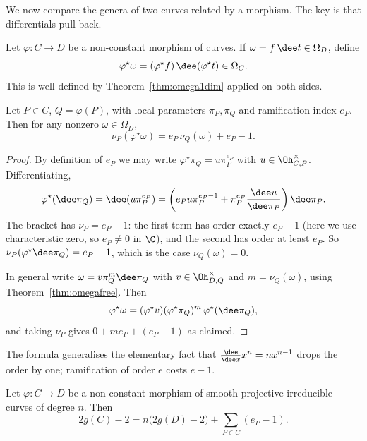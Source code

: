 We now compare the genera of two curves related by a morphism. The key is that differentials pull back.

Let $\varphi \colon C \to D$ be a non-constant morphism of curves. If $\omega = f\,\dee t \in \Omega_D$, define
$$\varphi^\star\omega = (\varphi^\star f)\,\dee(\varphi^\star t) \in \Omega_C.$$
This is well defined by Theorem~\ref{thm:omega1dim} applied on both sides.

\begin{lemma}\label{lem:pullbackdiff}
	Let $P \in C$, $Q = \varphi(P)$, with local parameters $\pi_P,\pi_Q$ and ramification index $e_P$. Then for any nonzero $\omega \in \Omega_D$,
	$$\nu_P(\varphi^\star\omega) = e_P\,\nu_Q(\omega) + e_P - 1.$$
\end{lemma}

\begin{proof}
	By definition of $e_P$ we may write $\varphi^\star\pi_Q = u\pi_P^{e_P}$ with $u \in \Oh_{C,P}^\times$. Differentiating,
	$$\varphi^\star(\dee\pi_Q) = \dee(u\pi_P^{e_P}) = \left(e_Pu\pi_P^{e_P-1} + \pi_P^{e_P}\frac{\dee u}{\dee \pi_P}\right)\dee\pi_P.$$
	The bracket has $\nu_P = e_P - 1$: the first term has order exactly $e_P-1$ (here we use characteristic zero, so $e_P \neq 0$ in $\C$), and the second has order at least $e_P$. So $\nu_P(\varphi^\star\dee\pi_Q) = e_P-1$, which is the case $\nu_Q(\omega) = 0$.

	In general write $\omega = v\pi_Q^m\dee\pi_Q$ with $v \in \Oh_{D,Q}^\times$ and $m = \nu_Q(\omega)$, using Theorem~\ref{thm:omegafree}. Then
	$$\varphi^\star\omega = (\varphi^\star v)(\varphi^\star\pi_Q)^m\,\varphi^\star(\dee\pi_Q),$$
	and taking $\nu_P$ gives $0 + me_P + (e_P-1)$ as claimed.
\end{proof}

The formula generalises the elementary fact that $\frac{\dee}{\dee x}x^n = nx^{n-1}$ drops the order by one; ramification of order $e$ costs $e-1$.

\begin{theorem}\label{ag-thm:RH}
	Let $\varphi \colon C \to D$ be a non-constant morphism of smooth projective irreducible curves of degree $n$. Then
	$$2g(C) - 2 = n\big(2g(D) - 2\big) + \sum_{P \in C}(e_P - 1).$$
\end{theorem}

